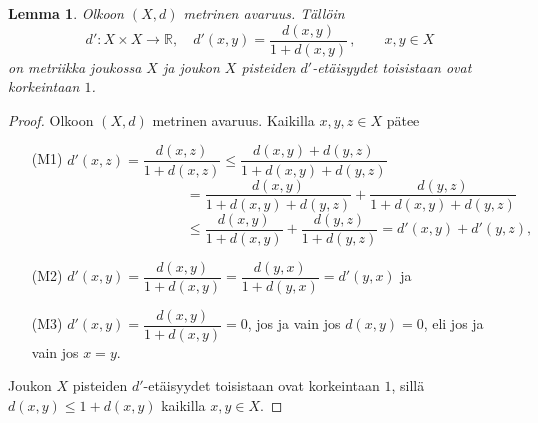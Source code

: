 \documentclass[12pt,a4paper,leqno]{report}
\newcommand{\R}{\mathbb{R}}
\theoremstyle{plain}
\newtheorem{lem}[equation]{Lemma}
\theoremstyle{definition}
\theoremstyle{remark}
\begin{document}
\begin{lem}\label{rajmetri} Olkoon $(X,d)$ metrinen avaruus. Tällöin
$$d'\colon X\times X \rightarrow \R,\quad d'(x,y)=\dfrac{d(x,y)}{1+d(x,y)} \, , \qquad x,y\in X$$
on metriikka joukossa $X$ ja joukon $X$ pisteiden $d'$-etäisyydet toisistaan ovat korkeintaan $1$.
\end{lem}
\begin{proof}
Olkoon $(X,d)$ metrinen avaruus. Kaikilla $x,y,z\in X$ pätee
\begin{itemize}
\item[(M1)]$d'(x,z)=\dfrac{d(x,z)}{1+d(x,z)}
\leq \dfrac{d(x,y)+d(y,z)}{1+d(x,y)+d(y,z)}$\\
$\phantom{d'(x,z)=\dfrac{d(x,z)}{1+d(x,z)}}
= \dfrac{d(x,y)}{1+d(x,y)+d(y,z)}+ \dfrac{d(y,z)}{1+d(x,y)+d(y,z)}$\\
$\phantom{d'(x,z)=\dfrac{d(x,z)}{1+d(x,z)}}
\leq \dfrac{d(x,y)}{1+d(x,y)}+ \dfrac{d(y,z)}{1+d(y,z)}=d'(x,y)+d'(y,z),$
\item[(M2)]$d'(x,y)=\dfrac{d(x,y)}{1+d(x,y)}
=\dfrac{d(y,x)}{1+d(y,x)}=d'(y,x)$ ja
\item[(M3)]$d'(x,y)=\dfrac{d(x,y)}{1+d(x,y)}=0$, jos ja vain jos $d(x,y)=0$, eli jos ja vain jos $x=y$.
\end{itemize} 
Joukon $X$ pisteiden $d'$-etäisyydet toisistaan ovat korkeintaan $1$, sillä $d(x,y)\leq 1+d(x,y)$ kaikilla $x,y\in X$.
\end{proof}

\end{document}
